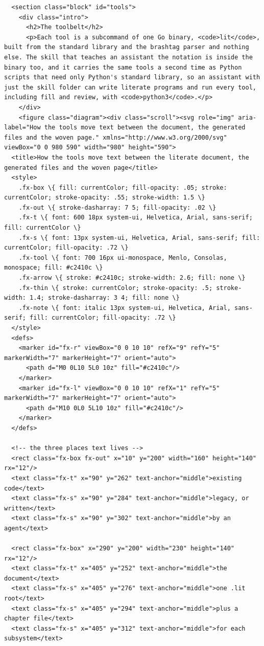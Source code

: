 \documentclass[10pt,a4paper]{article}
\begin{document}
\begin{Verbatim}
  <section class="block" id="tools">
    <div class="intro">
      <h2>The toolbelt</h2>
      <p>Each tool is a subcommand of one Go binary, <code>lit</code>, built from the standard library and the brashtag parser and nothing else. The skill that teaches an assistant the notation is inside the binary too, and it carries the same tools a second time as Python scripts that need only Python's standard library, so an assistant with just the skill folder can write literate programs and run every tool, including fill and review, with <code>python3</code>.</p>
    </div>
    <figure class="diagram"><div class="scroll"><svg role="img" aria-label="How the tools move text between the document, the generated files and the woven page." xmlns="http://www.w3.org/2000/svg" viewBox="0 0 980 590" width="980" height="590">
  <title>How the tools move text between the literate document, the generated files and the woven page</title>
  <style>
    .fx-box \{ fill: currentColor; fill-opacity: .05; stroke: currentColor; stroke-opacity: .55; stroke-width: 1.5 \}
    .fx-out \{ stroke-dasharray: 7 5; fill-opacity: .02 \}
    .fx-t \{ font: 600 18px system-ui, Helvetica, Arial, sans-serif; fill: currentColor \}
    .fx-s \{ font: 13px system-ui, Helvetica, Arial, sans-serif; fill: currentColor; fill-opacity: .72 \}
    .fx-tool \{ font: 700 16px ui-monospace, Menlo, Consolas, monospace; fill: #c2410c \}
    .fx-arrow \{ stroke: #c2410c; stroke-width: 2.6; fill: none \}
    .fx-thin \{ stroke: currentColor; stroke-opacity: .5; stroke-width: 1.4; stroke-dasharray: 3 4; fill: none \}
    .fx-note \{ font: italic 13px system-ui, Helvetica, Arial, sans-serif; fill: currentColor; fill-opacity: .72 \}
  </style>
  <defs>
    <marker id="fx-r" viewBox="0 0 10 10" refX="9" refY="5" markerWidth="7" markerHeight="7" orient="auto">
      <path d="M0 0L10 5L0 10z" fill="#c2410c"/>
    </marker>
    <marker id="fx-l" viewBox="0 0 10 10" refX="1" refY="5" markerWidth="7" markerHeight="7" orient="auto">
      <path d="M10 0L0 5L10 10z" fill="#c2410c"/>
    </marker>
  </defs>

  <!-- the three places text lives -->
  <rect class="fx-box fx-out" x="10" y="200" width="160" height="140" rx="12"/>
  <text class="fx-t" x="90" y="262" text-anchor="middle">existing code</text>
  <text class="fx-s" x="90" y="284" text-anchor="middle">legacy, or written</text>
  <text class="fx-s" x="90" y="302" text-anchor="middle">by an agent</text>

  <rect class="fx-box" x="290" y="200" width="230" height="140" rx="12"/>
  <text class="fx-t" x="405" y="252" text-anchor="middle">the document</text>
  <text class="fx-s" x="405" y="276" text-anchor="middle">one .lit root</text>
  <text class="fx-s" x="405" y="294" text-anchor="middle">plus a chapter file</text>
  <text class="fx-s" x="405" y="312" text-anchor="middle">for each subsystem</text>


\end{Verbatim}
\end{document}
